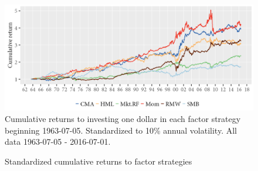\begin{figure}[H]
  \caption{Standardized cumulative returns to factor strategies}
  \label{diag:cumretstd}
  \toprule
  \centering
  \begin{minipage}{\textwidth}
  \includegraphics[scale=1]{graphics/cumretStdPlot.png}  
  \bottomrule
  \vspace{3mm}
  \footnotesize
  Cumulative returns to investing one dollar in each factor strategy beginning 1963-07-05. Standardized to 10\% annual volatility. All data 1963-07-05 - 2016-07-01.
  \end{minipage}
\end{figure}